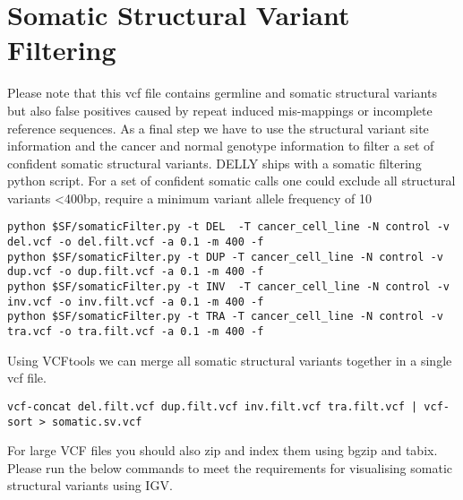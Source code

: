 \section{Somatic Structural Variant Filtering}

\begin{information}
Please note that this vcf file contains germline and somatic structural variants but also false positives caused by repeat induced mis-mappings or incomplete reference sequences. As a final step we have to use the structural variant site information and the cancer and normal genotype information to filter a set of confident somatic structural variants. DELLY ships with a somatic filtering python script. For a set of confident somatic calls one could exclude all structural variants \textless400bp, require a minimum variant allele frequency of 10%

\end{information}
\begin{steps}
\begin{lstlisting}
python $SF/somaticFilter.py -t DEL  -T cancer_cell_line -N control -v del.vcf -o del.filt.vcf -a 0.1 -m 400 -f
python $SF/somaticFilter.py -t DUP -T cancer_cell_line -N control -v dup.vcf -o dup.filt.vcf -a 0.1 -m 400 -f
python $SF/somaticFilter.py -t INV  -T cancer_cell_line -N control -v inv.vcf -o inv.filt.vcf -a 0.1 -m 400 -f
python $SF/somaticFilter.py -t TRA -T cancer_cell_line -N control -v tra.vcf -o tra.filt.vcf -a 0.1 -m 400 -f
\end{lstlisting}
\end{steps}


\begin{steps}
Using VCFtools we can merge all somatic structural variants together in a single vcf file.
\begin{lstlisting}
vcf-concat del.filt.vcf dup.filt.vcf inv.filt.vcf tra.filt.vcf | vcf-sort > somatic.sv.vcf
\end{lstlisting}
\end{steps}

\begin{information}
For large VCF files you should also zip and index them using bgzip and tabix. Please run the below commands to meet the requirements for visualising somatic structural variants using IGV.  
\end{information}

